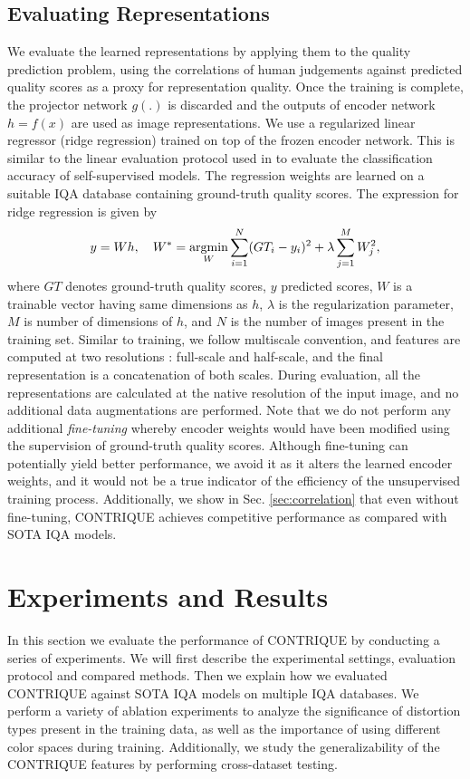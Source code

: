 \documentclass[journal]{IEEEtran}
\newcommand{\argmin}{\operatornamewithlimits{argmin}}
\begin{document}
\subsection{Evaluating Representations}
We evaluate the learned representations by applying them to the quality prediction problem, using the correlations of human judgements against predicted quality scores as a proxy for representation quality. Once the training is complete, the projector network $g(.)$ is discarded and the outputs of encoder network $h = f(x)$ are used as image representations. We use a regularized linear regressor (ridge regression) trained on top of the frozen encoder network. This is similar to the linear evaluation protocol used in \cite{zhang2016colorful,oord2018representation,bachman2019learning} to evaluate the classification accuracy of self-supervised models. The regression weights are learned on a suitable IQA database containing ground-truth quality scores. The expression for ridge regression is given by
\begin{align}
    y = W h, \quad W^* = \argmin_{W} \sum_{i=1} ^N (GT_i - y_i)^2 + \lambda \sum_{j=1} ^M W_j^2,
    \label{eqn:regressor}
\end{align}
where $GT$ denotes ground-truth quality scores, $y$ predicted scores, $W$ is a trainable vector having same dimensions as $h$, $\lambda$ is the regularization parameter, $M$ is number of dimensions of $h$, and $N$ is the number of images present in the training set. Similar to training, we follow multiscale convention, and features are computed at two resolutions : full-scale and half-scale, and the final representation is a concatenation of both scales. During evaluation, all the representations are calculated at the native resolution of the input image, and no additional data augmentations are performed. Note that we do not perform any additional \textit{fine-tuning} whereby encoder weights would have been modified using the supervision of ground-truth quality scores. Although fine-tuning can potentially yield better performance, we avoid it as it alters the learned encoder weights, and it would not be a true indicator of the efficiency of the unsupervised training process. Additionally, we show in Sec. \ref{sec:correlation} that even without fine-tuning, CONTRIQUE achieves competitive performance as compared with SOTA IQA models.

\section{Experiments and Results}
\label{sec:experiments}
In this section we evaluate the performance of CONTRIQUE by conducting a series of experiments. We will first describe the experimental settings, evaluation protocol and compared methods. Then we explain how we evaluated CONTRIQUE against SOTA IQA models on multiple IQA databases. We perform a variety of ablation experiments to analyze the significance of distortion types present in the training data, as well as the importance of using different color spaces during training. Additionally, we study the generalizability of the CONTRIQUE features by performing cross-dataset testing.
\end{document}
